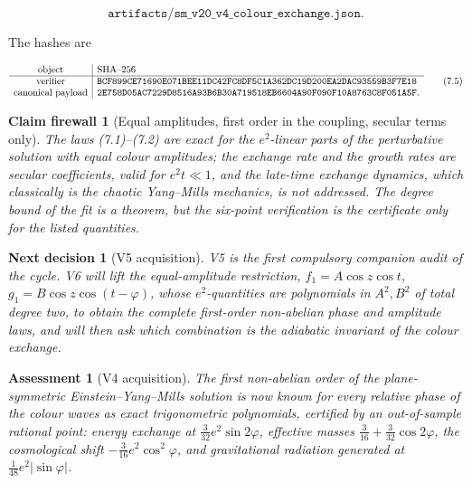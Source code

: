 \documentclass[11pt]{article}
\newtheorem{firewall}[theorem]{Claim firewall}
\newtheorem{decision}[theorem]{Next decision}
\newtheorem{assessment}[theorem]{Assessment}
\theoremstyle{remark}
\begin{document}
\[
 \texttt{artifacts/sm\_v20\_v4\_colour\_exchange.json}.               \tag{7.4}
\]

The hashes are

\[
\begin{array}{c|l}
\hbox{object}&\hbox{SHA--256}\\ \hline
\hbox{verifier}&
\texttt{BCF899CE71690E071BEE11DC42FC8DF5C1A362DC19D200EA2DAC93559B3F7E18}\\
\hbox{canonical payload}&
\texttt{2E758D05AC7229D8516A93B6B30A719518EB6604A90F090F10A8763C8F051A5F}.
\end{array}                                                     \tag{7.5}
\]

\begin{firewall}[Equal amplitudes, first order in the coupling, secular terms only]
\label{fire:v20v4}
The laws (7.1)--(7.2) are exact for the \(e^2\)-linear parts of the
perturbative solution with equal colour amplitudes; the exchange rate
and the growth rates are secular coefficients, valid for
\(e^2t\ll1\), and the late-time exchange dynamics, which classically
is the chaotic Yang--Mills mechanics, is not addressed.  The degree
bound of the fit is a theorem, but the six-point verification is the
certificate only for the listed quantities.
\end{firewall}

\begin{decision}[V5 acquisition]
\label{dec:v20v4-next}
V5 is the first compulsory companion audit of the cycle.  V6 will
lift the equal-amplitude restriction, \(f_1=A\cos z\cos t\),
\(g_1=B\cos z\cos(t-\varphi)\), whose \(e^2\)-quantities are
polynomials in \(A^2,B^2\) of total degree two, to obtain the complete
first-order non-abelian phase and amplitude laws, and will then ask
which combination is the adiabatic invariant of the colour exchange.
\end{decision}

\begin{assessment}[V4 acquisition]
\label{ass:v20v4}
The first non-abelian order of the plane-symmetric Einstein--Yang--Mills
solution is now known for every relative phase of the colour waves
as exact trigonometric polynomials, certified by an out-of-sample
rational point: energy exchange at \(\tfrac3{32}e^2\sin2\varphi\),
effective masses \(\tfrac3{16}+\tfrac3{32}\cos2\varphi\), the
cosmological shift \(-\tfrac3{16}e^2\cos^2\varphi\), and gravitational
radiation generated at \(\tfrac1{48}e^2|\sin\varphi|\).
\end{assessment}
\end{document}
